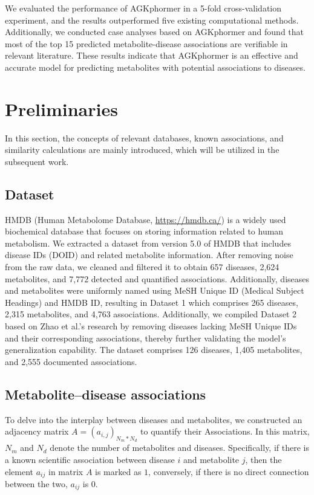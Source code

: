 \documentclass[a4paper,fleqn]{cas-dc}
\begin{document}
We evaluated the performance of AGKphormer in a 5-fold cross-validation experiment, and the results outperformed five existing computational methods. Additionally, we conducted case analyses based on AGKphormer and found that most of the top 15 predicted metabolite-disease associations are verifiable in relevant literature. These results indicate that AGKphormer is an effective and accurate model for predicting metabolites with potential associations to diseases.


\section{Preliminaries}\label{sec2}
In this section, the concepts of relevant databases, known associations, and similarity calculations are mainly introduced, which will be utilized in the subsequent work.

\subsection{Dataset}
HMDB (Human Metabolome Database, \url{https://hmdb.ca/})\cite{wishart2022hmdb} is a widely used biochemical database that focuses on storing information related to human metabolism. 
We extracted a dataset from version 5.0 of HMDB that includes disease IDs (DOID) and related metabolite information. After removing noise from the raw data, we cleaned and filtered it to obtain 657 diseases, 2,624 metabolites, and 7,772 detected and quantified associations. Additionally, diseases and metabolites were uniformly named using MeSH Unique ID (Medical Subject Headings)\cite{lipscomb2000medical} and HMDB ID, resulting in Dataset 1 which comprises 265 diseases, 2,315 metabolites, and 4,763 associations. 
Additionally, we compiled Dataset 2 based on Zhao et al.'s \cite{zhao2021deep} research by removing diseases lacking MeSH Unique IDs and their corresponding associations, thereby further validating the model's generalization capability. The dataset comprises 126 diseases, 1,405 metabolites, and 2,555 documented associations.

\subsection{Metabolite–disease associations}
To delve into the interplay between diseases and metabolites, we constructed an adjacency matrix $A = (a_{i,j})_{N_{m}*N_{d}}$ to quantify their Associations. In this matrix, $ N_{m}$ and $N_{d} $ denote the number of metabolites and diseases. Specifically, if there is a known scientific association between disease \(i\) and metabolite \(j\), then the element $a_{ij}$ in matrix \(A\) is marked as \(1\), conversely, if there is no direct connection between the two, $a_{ij}$ is 0.
\end{document}
